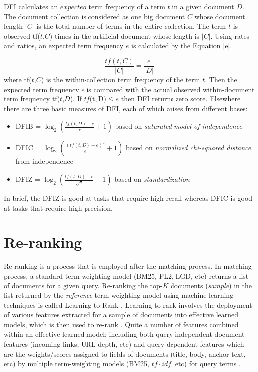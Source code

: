 DFI calculates an $expected$ term frequency of a term $t$ in a given document $D$.
The document collection is considered as one big document $C$ whose document length $|C|$ is the total number of terms in the entire collection.
The term $t$ is observed tf($t$,$C$) times in the artificial document whose length is $|C|$.
Using rates and ratios, an expected term frequency $e$  is calculated by the Equation \ref{e}.

\begin{equation}\label{e}
\frac{tf(t,C)}{|C|}  = \frac{e}{|D|}
\end{equation}
where tf($t$,$C$) is the within-collection term frequency of the term $t$.
Then the expected term frequency $e$ is compared with the actual observed within-document term frequency tf($t$,$D$).
If $tf($t$,$D$) \leq e$ then DFI returns zero score. 
Elsewhere there are three basic measures of DFI, each of which arises from different bases:

\begin{itemize}  
\item DFIB = $\log_2{\left(\frac{tf(t,D)-e}{e}+1\right)}$ based on \emph{saturated model of independence}
\item DFIC = $\log_2{\left(\frac{(tf(t,D)-e)^2}{e}+1\right)}$ based on \emph{normalized chi-squared distance} from independence
\item DFIZ = $\log_2{\left(\frac{tf(t,D)-e}{\sqrt{e}}+1\right)}$ based on \emph{standardization}
\end{itemize}

In brief, the DFIZ is good at tasks that require high recall whereas DFIC is good at tasks that require high precision.

\section{Re-ranking}

Re-ranking is a process that is employed after the matching process.
In matching process, a standard term-weighting model (BM25, PL2, LGD, etc) returns a list of documents for a given query.
Re-ranking the top-$K$ documents (\emph{sample}) in the list returned by the \emph{reference} term-weighting model using machine learning techniques is called Learning to Rank \citep{LTR}.
Learning to rank involves the deployment of various features extracted for a sample of documents into effective learned models, which is then used to re-rank \citep{WhensHows}.
Quite a number of features combined within an effective learned model: including both query independent document features (incoming links, URL depth, etc) and query dependent features which are the weights/scores assigned to fields of documents (title, body, anchor text, etc) by multiple term-weighting models (BM25, $tf\cdot idf$, etc) for query terms \citep{MulFeatures}.


